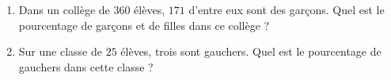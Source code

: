 
\begin{exercice}\label{exo2smath-0121}

    \begin{enumerate}
        \item
Dans un collège de $360$ élèves, $171$ d'entre eux sont des garçons. Quel est le pourcentage de garçons et de filles dans ce collège ?
\item
    Sur une classe de \( 25\) élèves, trois sont gauchers. Quel est le pourcentage de gauchers dans cette classe ?
    \end{enumerate}

\end{exercice}
